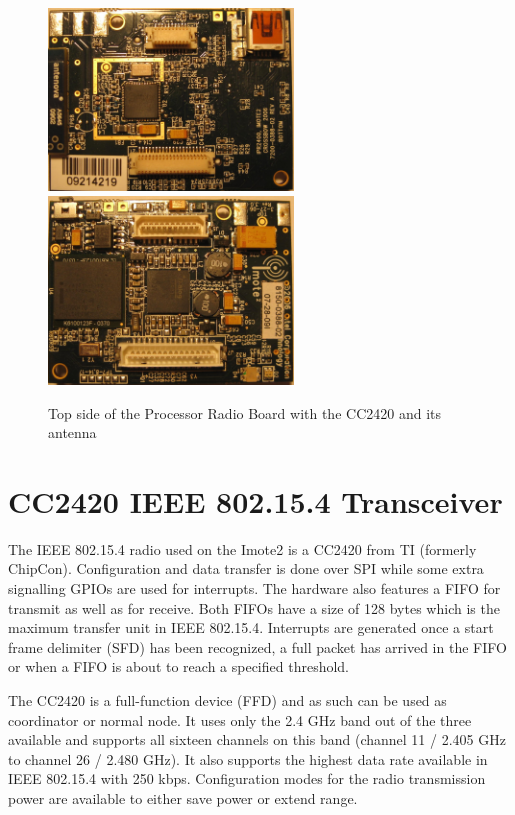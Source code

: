\begin{figure}
  \begin{center}
    \includegraphics[width=6.5cm]{images/imote_top_cutted}
    \includegraphics[width=6.5cm]{images/imote_bottom_cutted}
    \caption{Top side of the Processor Radio Board with the CC2420 and its antenna}
        \label{fig:imote2top}
  \end{center}
\end{figure}

\section{CC2420 IEEE 802.15.4 Transceiver}
\label{cc2420}
The IEEE 802.15.4 radio used on the Imote2 is a CC2420 \cite{cc2420} from TI (formerly ChipCon).
Configuration and data transfer is done over SPI while some extra signalling
GPIOs are used for interrupts. The hardware also features a FIFO for transmit as
well as for receive. Both FIFOs have a size of 128 bytes which is the maximum
transfer unit in IEEE 802.15.4. Interrupts are generated once a start frame delimiter
(SFD) has been recognized, a full packet has arrived in the FIFO or when a FIFO is
about to reach a specified threshold.

The CC2420 is a full-function device (FFD) and as such can be used as
coordinator or normal node. It uses only the 2.4 GHz band out of the three
available and supports all sixteen channels on this band (channel 11 / 2.405 GHz
to channel 26 / 2.480 GHz). It also supports the highest data rate available
in IEEE 802.15.4 with 250 kbps. Configuration modes for the radio transmission power
are available to either save power or extend range.

